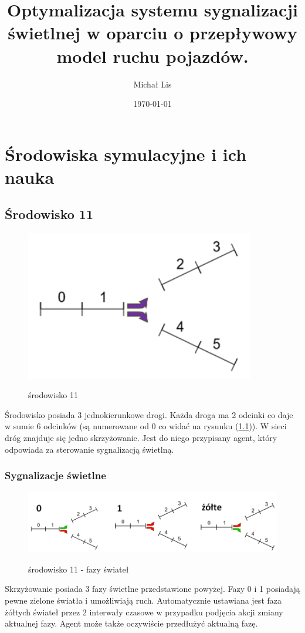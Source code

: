 \documentclass[12pt]{book}
\theoremstyle{plain}
\let\oldref\ref
\renewcommand{\ref}[1]{(\oldref{#1})}
\begin{document}
	\title{Optymalizacja  systemu sygnalizacji świetlnej w 
		oparciu o przepływowy model ruchu pojazdów.}
	\author{Michał Lis}
	\date{\today}
	\maketitle
	\tableofcontents
	
	\chapter {Środowiska symulacyjne i ich nauka}
	\section{Środowisko 11}
	\begin{figure}[H]
		\centering
		\includegraphics[width=10cm]{images/env_11}
		\label{fig:env_11}
		\caption{środowisko 11}
	\end{figure}
	
	Środowisko posiada 3 jednokierunkowe drogi. Każda droga ma 2 odcinki co daje w sumie 6 odcinków (są numerowane od 0 co widać na rysunku \ref{fig:env_11}).
	W sieci dróg znajduje się jedno skrzyżowanie. Jest do niego przypisany agent, który odpowiada za sterowanie sygnalizacją świetlną.
	
\subsection{Sygnalizacje świetlne}	
	\begin{figure}[H]
		\centering
		\includegraphics[width=17cm]{images/env_11_fazy}
		\label{fig:env_11_fazy}
		\caption{środowisko 11 - fazy świateł}
	\end{figure}\noindent
Skrzyżowanie posiada 3 fazy świetlne przedstawione powyżej. Fazy 0 i 1 posiadają pewne zielone światła i umożliwiają ruch. Automatycznie ustawiana jest faza żółtych świateł przez 2 interwały czasowe w przypadku podjęcia akcji zmiany aktualnej fazy. Agent może także oczywiście przedłużyć aktualną fazę.
\end{document}
